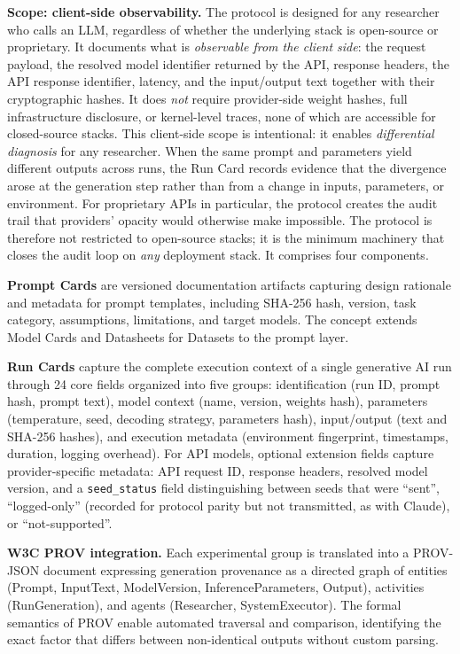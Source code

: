 \documentclass[sn-nature]{sn-jnl}
\begin{document}
\textbf{Scope: client-side observability.}
The protocol is designed for any researcher who calls an LLM, regardless of whether the underlying stack is open-source or proprietary.
It documents what is \emph{observable from the client side}: the request payload, the resolved model identifier returned by the API, response headers, the API response identifier, latency, and the input/output text together with their cryptographic hashes.
It does \emph{not} require provider-side weight hashes, full infrastructure disclosure, or kernel-level traces, none of which are accessible for closed-source stacks.
This client-side scope is intentional: it enables \emph{differential diagnosis} for any researcher.
When the same prompt and parameters yield different outputs across runs, the Run Card records evidence that the divergence arose at the generation step rather than from a change in inputs, parameters, or environment.
For proprietary APIs in particular, the protocol creates the audit trail that providers' opacity would otherwise make impossible.
The protocol is therefore not restricted to open-source stacks; it is the minimum machinery that closes the audit loop on \emph{any} deployment stack.
It comprises four components.

\textbf{Prompt Cards} are versioned documentation artifacts capturing design rationale and metadata for prompt templates, including SHA-256 hash, version, task category, assumptions, limitations, and target models.
The concept extends Model Cards\cite{mitchell2019model} and Datasheets for Datasets\cite{gebru2021datasheets} to the prompt layer.

\textbf{Run Cards} capture the complete execution context of a single generative AI run through 24 core fields organized into five groups: identification (run ID, prompt hash, prompt text), model context (name, version, weights hash), parameters (temperature, seed, decoding strategy, parameters hash), input/output (text and SHA-256 hashes), and execution metadata (environment fingerprint, timestamps, duration, logging overhead).
For API models, optional extension fields capture provider-specific metadata: API request ID, response headers, resolved model version, and a \texttt{seed\_status} field distinguishing between seeds that were ``sent'', ``logged-only'' (recorded for protocol parity but not transmitted, as with Claude), or ``not-supported''.

\textbf{W3C PROV integration.}
Each experimental group is translated into a PROV-JSON document\cite{w3cprov2013} expressing generation provenance as a directed graph of entities (Prompt, InputText, ModelVersion, InferenceParameters, Output), activities (RunGeneration), and agents (Researcher, SystemExecutor).
The formal semantics of PROV enable automated traversal and comparison, identifying the exact factor that differs between non-identical outputs without custom parsing.
\end{document}
